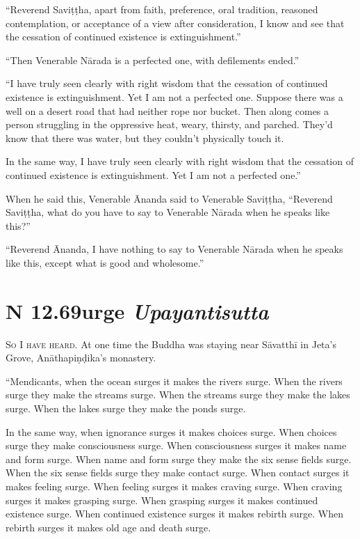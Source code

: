 \documentclass[12pt,openany]{book}%
\newcommand*{\suttatitleacronym}[1]{\smaller[2]{#1}\vspace*{.3em}}
\newcommand*{\suttatitletranslation}[1]{\linebreak{#1}}
\newcommand*{\suttatitleroot}[1]{\linebreak\smaller[2]\itshape{#1}}
\newcommand*{\tocacronym}[1]{\hspace*{-3.3em}{#1}\quad}
\newcommand*{\toctranslation}[1]{#1}
\newcommand*{\tocroot}[1]{(\textit{#1})}
\newcommand*{\scevam}[1]{\textsc{#1}}
\begin{document}
“Reverend \textsanskrit{Saviṭṭha}, apart from faith, preference, oral tradition, reasoned contemplation, or acceptance of a view after consideration, I know and see that the cessation of continued existence is extinguishment.” 

“Then Venerable \textsanskrit{Nārada} is a perfected one, with defilements ended.” 

“I have truly seen clearly with right wisdom that the cessation of continued existence is extinguishment. Yet I am not a perfected one. Suppose there was a well on a desert road that had neither rope nor bucket. Then along comes a person struggling in the oppressive heat, weary, thirsty, and parched. They’d know that there was water, but they couldn’t physically touch it. 

In the same way, I have truly seen clearly with right wisdom that the cessation of continued existence is extinguishment. Yet I am not a perfected one.” 

When he said this, Venerable Ānanda said to Venerable \textsanskrit{Saviṭṭha}, “Reverend \textsanskrit{Saviṭṭha}, what do you have to say to Venerable \textsanskrit{Nārada} when he speaks like this?” 

“Reverend Ānanda, I have nothing to say to Venerable \textsanskrit{Nārada} when he speaks like this, except what is good and wholesome.” 

%
\section*{{\suttatitleacronym SN 12.69}{\suttatitletranslation Surge }{\suttatitleroot Upayantisutta}}
\addcontentsline{toc}{section}{\tocacronym{SN 12.69} \toctranslation{Surge } \tocroot{Upayantisutta}}

\scevam{So I have heard. }At one time the Buddha was staying near \textsanskrit{Sāvatthī} in Jeta’s Grove, \textsanskrit{Anāthapiṇḍika}’s monastery. 

“Mendicants, when the ocean surges it makes the rivers surge. When the rivers surge they make the streams surge. When the streams surge they make the lakes surge. When the lakes surge they make the ponds surge. 

In the same way, when ignorance surges it makes choices surge. When choices surge they make consciousness surge. When consciousness surges it makes name and form surge. When name and form surge they make the six sense fields surge. When the six sense fields surge they make contact surge. When contact surges it makes feeling surge. When feeling surges it makes craving surge. When craving surges it makes grasping surge. When grasping surges it makes continued existence surge. When continued existence surges it makes rebirth surge. When rebirth surges it makes old age and death surge. 
\end{document}
